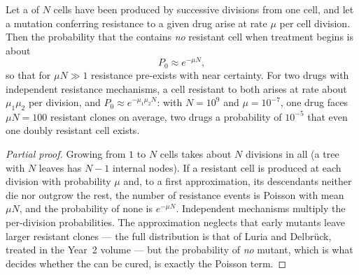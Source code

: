 \begin{theorem}\label{thm:b3:cancer-biology:goldie-coldman}
Let a  of $N$ cells have been produced by successive divisions
from one cell, and let a mutation conferring resistance to a given drug
arise at rate $\mu$ per cell division. Then the probability that the
 contains \emph{no} resistant cell when treatment begins is about
\[
P_{0} \approx e^{-\mu N},
\]
so that for $\mu N \gg 1$ resistance pre-exists with near certainty.
For two drugs with independent resistance mechanisms, a cell resistant
to both arises at rate about $\mu_{1}\mu_{2}$ per division, and $P_{0}
\approx e^{-\mu_{1}\mu_{2}N}$: with $N = 10^{9}$ and $\mu = 10^{-7}$,
one drug faces $\mu N = 100$ resistant clones on average, two drugs a
probability of $10^{-5}$ that even one doubly resistant cell exists.
\end{theorem}
\begin{proof}[Partial proof]
Growing from $1$ to $N$ cells takes about $N$ divisions in all (a tree
with $N$ leaves has $N - 1$ internal nodes). If a resistant cell is
produced at each division with probability $\mu$ and, to a first
approximation, its descendants neither die nor outgrow the rest, the
number of resistance events is Poisson with mean $\mu N$, and the
probability of none is $e^{-\mu N}$. Independent mechanisms multiply
the per-division probabilities. The approximation neglects that early
mutants leave larger resistant clones --- the full distribution is that
of Luria and Delbrück, treated in the Year~2 volume --- but the
probability of \emph{no} mutant, which is what decides whether the
 can be cured, is exactly the Poisson term.
\end{proof}

